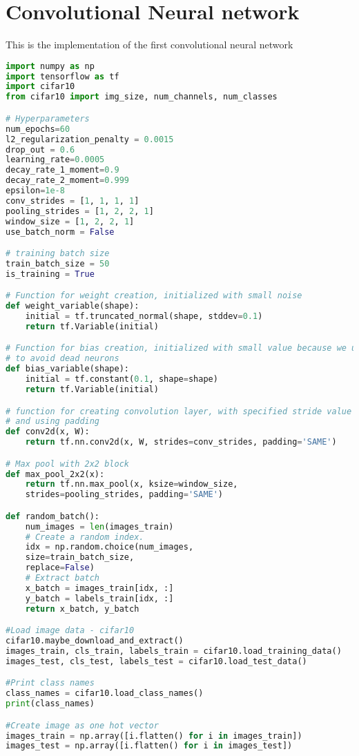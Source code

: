 \chapter{Convolutional Neural network}

This is the implementation of the first convolutional neural network

\begin{lstlisting}[language=Python, label=lst:neuralnet.py, caption={neural\_net.py}, basicstyle=\tiny]
import numpy as np
import tensorflow as tf
import cifar10
from cifar10 import img_size, num_channels, num_classes

# Hyperparameters
num_epochs=60
l2_regularization_penalty = 0.0015
drop_out = 0.6
learning_rate=0.0005
decay_rate_1_moment=0.9
decay_rate_2_moment=0.999
epsilon=1e-8
conv_strides = [1, 1, 1, 1]
pooling_strides = [1, 2, 2, 1]
window_size = [1, 2, 2, 1]
use_batch_norm = False

# training batch size
train_batch_size = 50
is_training = True

# Function for weight creation, initialized with small noise
def weight_variable(shape):
	initial = tf.truncated_normal(shape, stddev=0.1)
	return tf.Variable(initial)

# Function for bias creation, initialized with small value because we use relu
# to avoid dead neurons
def bias_variable(shape):
	initial = tf.constant(0.1, shape=shape)
	return tf.Variable(initial)

# function for creating convolution layer, with specified stride value
# and using padding
def conv2d(x, W):
	return tf.nn.conv2d(x, W, strides=conv_strides, padding='SAME')

# Max pool with 2x2 block
def max_pool_2x2(x):
	return tf.nn.max_pool(x, ksize=window_size,
	strides=pooling_strides, padding='SAME')

def random_batch():
	num_images = len(images_train)
	# Create a random index.
	idx = np.random.choice(num_images,
	size=train_batch_size,
	replace=False)
	# Extract batch                           
	x_batch = images_train[idx, :]
	y_batch = labels_train[idx, :]
	return x_batch, y_batch

#Load image data - cifar10
cifar10.maybe_download_and_extract()
images_train, cls_train, labels_train = cifar10.load_training_data()
images_test, cls_test, labels_test = cifar10.load_test_data()

#Print class names
class_names = cifar10.load_class_names()
print(class_names)

#Create image as one hot vector
images_train = np.array([i.flatten() for i in images_train])
images_test = np.array([i.flatten() for i in images_test])


\end{lstlisting}
